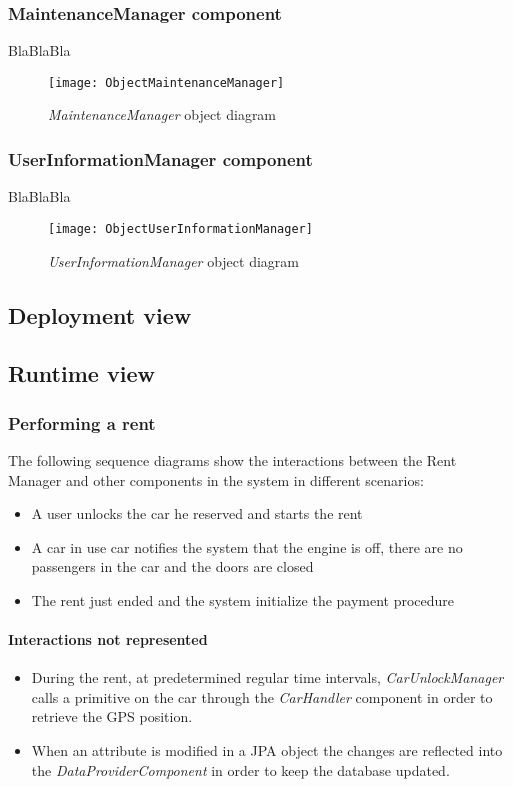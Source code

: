 \subsubsection{MaintenanceManager component}
BlaBlaBla
\begin{figure}[h!]
	\centering
	\texttt{[image: ObjectMaintenanceManager]}
	\caption{
		\label{fig:maintenanceManagerObjectDiagram} 
		\emph{MaintenanceManager} object diagram
	}
\end{figure}

\subsubsection{UserInformationManager component}
BlaBlaBla
\begin{figure}[h!]
	\centering
	\texttt{[image: ObjectUserInformationManager]}
	\caption{
		\label{fig:userInformationManagerObjectDiagram} 
		\emph{UserInformationManager} object diagram
	}
\end{figure}

\clearpage

\subsection{Deployment view}
\subsection{Runtime view}
\subsubsection{Performing a rent}
The following sequence diagrams show the interactions between the Rent Manager and other components in the system in different scenarios:
\begin{itemize}
	\item A user unlocks the car he reserved and starts the rent
	\item A car in use car notifies the system that the engine is off, there are no passengers in the car and the doors are closed
	\item The rent just ended and the system initialize the payment procedure
\end{itemize}

\paragraph{Interactions not represented}
\begin{itemize}
	\item During the rent, at predetermined regular time intervals, \emph{CarUnlockManager} calls a primitive on the car through the \emph{CarHandler} component in order to retrieve the GPS position.

	\item When an attribute is modified in a JPA object the changes are reflected into the \emph{DataProviderComponent} in order to keep the database updated.
\end{itemize}
\clearpage

